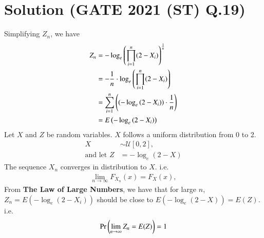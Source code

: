 \documentclass[journal,12pt,twocolumn]{IEEEtran}
\begin{document}
\section{Solution (GATE 2021 (ST) Q.19)}
Simplifying $Z_n$, we have
\begin{align}
    Z_n &= -\log_e \left( \prod\limits_{i=1}^n (2-X_i) \right)^\frac{1}{n}\\
        &= -\frac{1}{n}\cdot \log_e \left( \prod\limits_{i=1}^n (2-X_i) \right)\\
        &= \sum\limits_{i=1}^n \left( (-\log_e \left( 2-X_i )\right)\cdot\frac{1}{n} \right)\\
        &= E\left(-\log_e \left( 2-X_i \right)\right)
\end{align}
Let $X$ and $Z$ be random variables. $X$ follows a uniform distribution from 0 to 2.
\begin{align}
    X &\sim \mathcal{U}[0,2],\\
    \text{and let }    Z&=-\log_e (2-X)
\end{align}
The sequence $X_n$ converges in distribution to $X$. i.e.
\begin{align}
    \lim _{n\to \infty }F_{X_n}(x)=F_X(x),
\end{align}
From \textbf{The Law of Large Numbers}, we have that %
 for large $n$, $Z_n=E\left(-\log_e \left( 2-X_i \right)\right)$ should be close to $E\left(-\log_e \left( 2-X \right)\right)=E(Z)$. i.e.
\begin{align}
    \pr{\lim\limits_{n \to \infty}Z_n=E(Z)}=1
    \label{Zn_and_Z}
\end{align}
\end{document}
